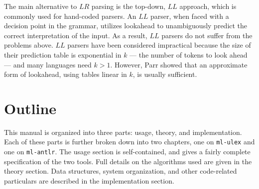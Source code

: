 The main alternative to $LR$ parsing is the top-down, $LL$ approach, which is commonly used for hand-coded parsers.  An $LL$ parser, when faced with a decision point in the grammar, utilizes lookahead to unambiguously predict the correct interpretation of the input.  As a result, $LL$ parsers do not suffer from the problems above.  $LL$ parsers have been considered impractical because the size of their prediction table is exponential in $k$ --- the number of tokens to look ahead --- and many languages need $k > 1$.  However, Parr showed that an approximate form of lookahead, using tables linear in $k$, is usually sufficient.


\section{Outline}

This manual is organized into three parts: usage, theory, and implementation.  Each of these parts is further broken down into two chapters, one on {\tt ml-ulex} and one on {\tt ml-antlr}.  The usage section is self-contained, and gives a fairly complete specification of the two tools.  Full details on the algorithms used are given in the theory section.  Data structures, system organization, and other code-related particulars are described in the implementation section.











